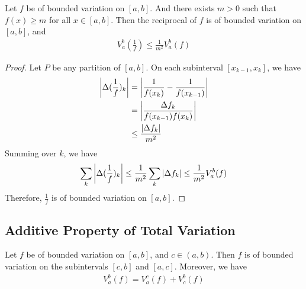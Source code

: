 \documentclass[thmcnt=section, color=blue, 12pt]{my-elegantbook}
\begin{document}
\begin{theorem}
	Let $f$ be of bounded variation on $[a, b]$.
	And there exists $m > 0$ such that $f(x) \geq m$ for all $x \in [a, b]$.
	Then the reciprocal of $f$ is of bounded variation on $[a, b]$, and
	\begin{align*}
		V_a^b ( \frac{1}{f} )
		\leq \frac{1}{m^2} V_a^b (f)
	\end{align*}
\end{theorem}

\begin{proof}
	Let $P$ be any partition of $[a, b]$.
	On each subinterval $[x_{k-1}, x_k]$, we have
	\begin{align*}
		\left\lvert \Delta (\frac{1}{f})_k \right\rvert
		 & = \left\lvert \frac{1}{f(x_k)} - \frac{1}{f(x_{k-1})} \right\rvert \\
		 & = \left\lvert \frac{\Delta f_k}{f(x_{k-1}) f(x_k)} \right\rvert    \\
		 & \leq \frac{\left\lvert  \Delta f_k  \right\rvert}{m^2}
	\end{align*}
	Summing over $k$, we have
	\begin{align*}
		\sum_k \left\lvert \Delta (\frac{1}{f})_k \right\rvert
		\leq \frac{1}{m^2} \sum_k \left\lvert \Delta f_k \right\rvert
		\leq \frac{1}{m^2} V_a^b (f)
	\end{align*}
	Therefore, $\frac{1}{f}$ is of bounded variation on $[a, b]$.
\end{proof}

\subsection{Additive Property of Total Variation}

\begin{theorem} \label{thm:2}
	Let $f$ be of bounded variation on $[a, b]$, and $c \in (a, b)$.
	Then $f$ is of bounded variation on the subintervals $[c, b]$ and $[a, c]$.
	Moreover, we have
	\begin{align}
		V_a^b(f) = V_a^c(f) + V_c^b(f)
		\label{eq:9}
	\end{align}
\end{theorem}
\end{document}
